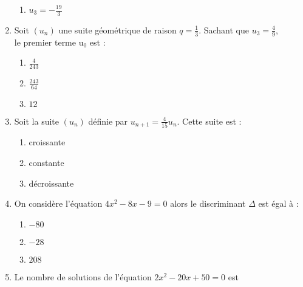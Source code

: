 \documentclass[oneside,twocolumn,landscape]{book}
\begin{document}
\begin{enumerate}
\begin{enumerate}
\item\MauvaiseReponse $u_{3}=-\frac{19}{3}$


\end{enumerate}



\item Soit $\left(u_{n}\right)$ une suite géométrique de raison $q=\frac{1}{3}$. Sachant que $u_{3}=\frac{4}{9}$,\\ le premier terme $\mathrm{u}_ {0}$ est :

\begin{enumerate}


\item\MauvaiseReponse $\frac{4}{243}$

\item\MauvaiseReponse $\frac{243}{64}$
\item\BonneReponse $12$

\end{enumerate}





\item Soit la suite $\left(u_{n}\right)$ définie par $u_{n+1}=\frac{4}{15}u_n$. Cette suite est :

\begin{enumerate}

\item\MauvaiseReponse croissante


\item\MauvaiseReponse constante
\item\BonneReponse décroissante

\end{enumerate}

\newpage


\item On considère l'équation $4x^{2}-8 x-9=0$ alors le discriminant $\Delta$ est égal à :

\begin{enumerate}


\item\MauvaiseReponse $-80$

\item\MauvaiseReponse $-28$
\item\BonneReponse $208$

\end{enumerate}



\item Le nombre de solutions de l'équation $2x^{2}-20 x+50=0$ est


\end{enumerate}
\end{document}
